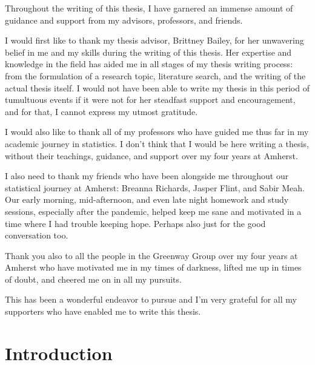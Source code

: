 \documentclass[12pt, twoside]{amherstthesis}
\begin{document}
  \begin{acknowledgments}
    Throughout the writing of this thesis, I have garnered an immense amount of guidance and support from my advisors, professors, and friends.

    I would first like to thank my thesis advisor, Brittney Bailey, for her unwavering belief in me and my skills during the writing of this thesis. Her expertise and knowledge in the field has aided me in all stages of my thesis writing process: from the formulation of a research topic, literature search, and the writing of the actual thesis itself. I would not have been able to write my thesis in this period of tumultuous events if it were not for her steadfast support and encouragement, and for that, I cannot express my utmost gratitude.

    I would also like to thank all of my professors who have guided me thus far in my academic journey in statistics. I don't think that I would be here writing a thesis, without their teachings, guidance, and support over my four years at Amherst.

    I also need to thank my friends who have been alongside me throughout our statistical journey at Amherst: Breanna Richards, Jasper Flint, and Sabir Meah. Our early morning, mid-afternoon, and even late night homework and study sessions, especially after the pandemic, helped keep me sane and motivated in a time where I had trouble keeping hope. Perhaps also just for the good conversation too.

    Thank you also to all the people in the Greenway Group over my four years at Amherst who have motivated me in my times of darkness, lifted me up in times of doubt, and cheered me on in all my pursuits.

    This has been a wonderful endeavor to pursue and I'm very grateful for all my supporters who have enabled me to write this thesis.
  \end{acknowledgments}

  \hypersetup{linkcolor=black}
  \setcounter{tocdepth}{2}
  \tableofcontents

  \listoftables

  \listoffigures


\mainmatter %
\pagestyle{fancyplain} %

\hypertarget{intro}{%
\chapter{Introduction}\label{intro}}
\end{document}

